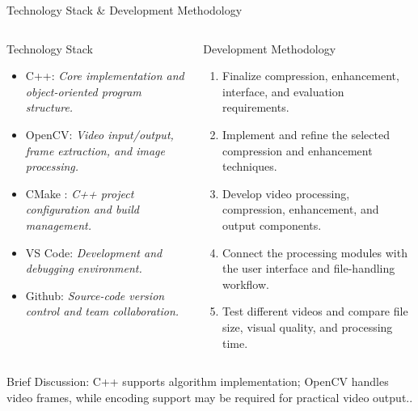 \documentclass[aspectratio=169,11pt]{beamer}
\newcommand{\smallnote}[1]{%
\vspace{0.08cm}
{\scriptsize\color{GEUGrey}#1}
}
\newcommand{\placeholder}[1]{%
\textit{\color{GEUGrey}#1}
}
\begin{document}
\begin{frame}{Technology Stack \& Development Methodology}
\scriptsize

\begin{columns}[T,totalwidth=\textwidth]


\begin{block}{Technology Stack}

\begin{itemize}\itemsep-2pt
\item C++: \placeholder{Core implementation and object-oriented program structure.}
\item OpenCV:\placeholder{Video input/output, frame extraction, and image processing.}
\item CMake : \placeholder{C++ project configuration and build management.}
\item VS Code: \placeholder{Development and debugging environment.}
\item Github: \placeholder{Source-code version control and team collaboration.}
\end{itemize}

\end{block}


\begin{block}{Development Methodology}

\begin{enumerate}\itemsep-2pt
\item Finalize compression, enhancement, interface, and evaluation requirements.
\item Implement and refine the selected compression and enhancement techniques.
\item Develop video processing, compression, enhancement, and output components.
\item Connect the processing modules with the user interface and file-handling workflow.
\item Test different videos and compare file size, visual quality, and processing time.
\end{enumerate}

\end{block}

\end{columns}

\smallnote{
Brief Discussion: C++ supports algorithm implementation; OpenCV handles video frames, while encoding support may be required for practical video output..
}

\end{frame}
\end{document}
